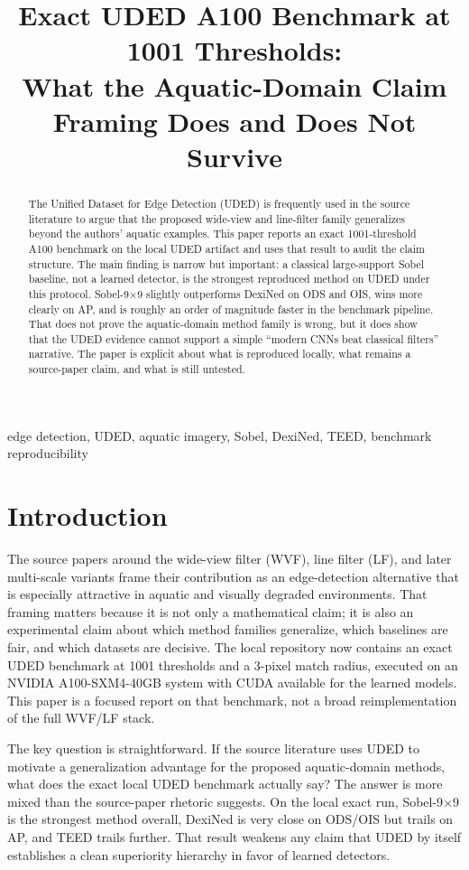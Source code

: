 \documentclass[conference]{IEEEtran}
\title{Exact UDED A100 Benchmark at 1001 Thresholds: \\What the Aquatic-Domain Claim Framing Does and Does Not Survive}
\author{\IEEEauthorblockN{Anonymous}
\IEEEauthorblockA{Independent reproduction paper}}
\begin{document}
\maketitle

\begin{abstract}
The Unified Dataset for Edge Detection (UDED) is frequently used in the source literature to argue that the proposed wide-view and line-filter family generalizes beyond the authors' aquatic examples. This paper reports an exact 1001-threshold A100 benchmark on the local UDED artifact and uses that result to audit the claim structure. The main finding is narrow but important: a classical large-support Sobel baseline, not a learned detector, is the strongest reproduced method on UDED under this protocol. Sobel-9$\times$9 slightly outperforms DexiNed on ODS and OIS, wins more clearly on AP, and is roughly an order of magnitude faster in the benchmark pipeline. That does not prove the aquatic-domain method family is wrong, but it does show that the UDED evidence cannot support a simple ``modern CNNs beat classical filters'' narrative. The paper is explicit about what is reproduced locally, what remains a source-paper claim, and what is still untested.
\end{abstract}

\begin{IEEEkeywords}
edge detection, UDED, aquatic imagery, Sobel, DexiNed, TEED, benchmark reproducibility
\end{IEEEkeywords}

\section{Introduction}
The source papers around the wide-view filter (WVF), line filter (LF), and later multi-scale variants frame their contribution as an edge-detection alternative that is especially attractive in aquatic and visually degraded environments. That framing matters because it is not only a mathematical claim; it is also an experimental claim about which method families generalize, which baselines are fair, and which datasets are decisive. The local repository now contains an exact UDED benchmark at 1001 thresholds and a 3-pixel match radius, executed on an NVIDIA A100-SXM4-40GB system with CUDA available for the learned models. This paper is a focused report on that benchmark, not a broad reimplementation of the full WVF/LF stack.

The key question is straightforward. If the source literature uses UDED to motivate a generalization advantage for the proposed aquatic-domain methods, what does the exact local UDED benchmark actually say? The answer is more mixed than the source-paper rhetoric suggests. On the local exact run, Sobel-9$\times$9 is the strongest method overall, DexiNed is very close on ODS/OIS but trails on AP, and TEED trails further. That result weakens any claim that UDED by itself establishes a clean superiority hierarchy in favor of learned detectors.
\end{document}
